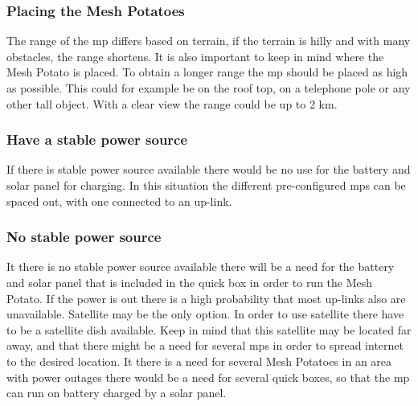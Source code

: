 \subsubsection{Placing the Mesh Potatoes}
The range of the \gls{mp} differs based on terrain, if the terrain is hilly and with many obstacles, the range shortens. It is also important to keep in mind where the Mesh Potato is placed. To obtain a longer range the \gls{mp} should be placed as high as possible. This could for example be on the roof top, on a telephone pole or any other tall object. With a clear view the range could be up to 2 km. 

\subsubsection{Have a stable power source}
If there is stable power source available there would be no use for the battery and solar panel for charging. In this situation the different pre-configured \glspl{mp} can be spaced out, with one connected to an up-link. 

\subsubsection{No stable power source}
It there is no stable power source available there will be a need for the battery and solar panel that is included in the \gls{quick} box in order to run the Mesh Potato. If the power is out there is a high probability that most up-links also are unavailable. Satellite may be the only option. In order to use satellite there have to be a satellite dish available. Keep in mind that this satellite may be located far away, and that there might be a need for several \glspl{mp} in order to spread internet to the desired location. It there is a need for several Mesh Potatoes in an area with power outages there would be a need for several \gls{quick} boxes, so that the \gls{mp} can run on battery charged by a solar panel. 